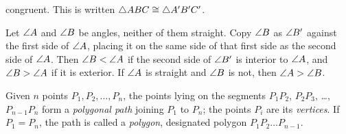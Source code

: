 \documentclass[11pt]{book}
\begin{document}
\begin{applist}
      congruent. This is written $\triangle ABC \cong \triangle A'B'C'$.
\item Let $\angle A$ and $\angle B$ be angles, neither of them straight. Copy
      $\angle B$ as $\angle B'$ against the first side of $\angle A$, placing
      it on the same side of that first side as the second side of
      $\angle A$. Then $\angle B < \angle A$ if the second side of $\angle B'$
      is interior to $\angle A$, and $\angle B > \angle A$ if it is exterior.
      If $\angle A$ is straight and $\angle B$ is not, then
      $\angle A > \angle B$.
\item Given $n$ points $P_1, P_2, \ldots, P_n$, the points lying on the
      segments $P_1P_2$, $P_2P_3$, \ldots, $P_{n-1}P_n$ form a
      \emph{polygonal path} joining $P_1$ to $P_n$; the points $P_i$ are
      its \emph{vertices}. If $P_1 = P_n$, the path is called a
      \emph{polygon}, designated polygon $P_1P_2 \ldots P_{n-1}$.


\end{applist}
\end{document}
